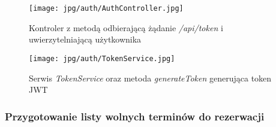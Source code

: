 \documentclass[11pt,a4paper]{article}
\begin{document}
\begin{figure}[H]
    \centering
    \texttt{[image: jpg/auth/AuthController.jpg]}
    \caption{Kontroler z metodą odbierającą żądanie \textsl{/api/token} i uwierzytelniającą użytkownika}
\end{figure}

\begin{figure}[H]
    \centering
    \texttt{[image: jpg/auth/TokenService.jpg]}
    \caption{Serwis \textsl{TokenService} oraz metoda \textsl{generateToken} generująca token JWT}
\end{figure}

\subsubsection{Przygotowanie listy wolnych terminów do rezerwacji}
\end{document}
